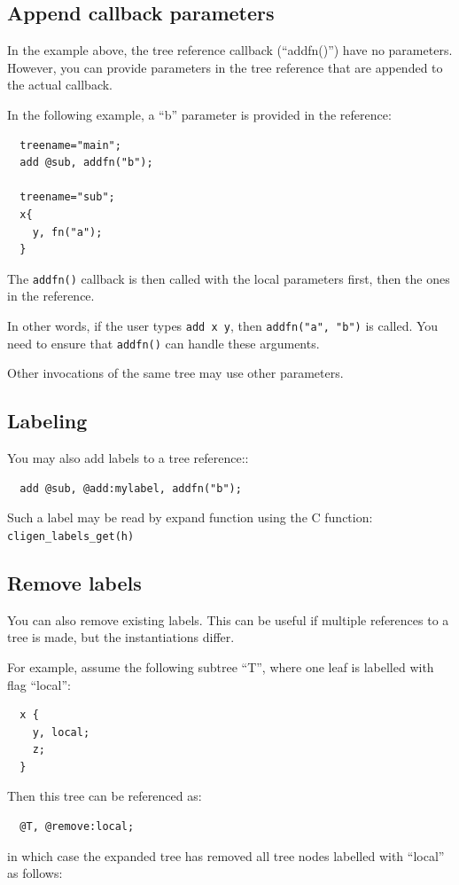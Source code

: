 \documentclass[a4paper, 10pt] {article}
\begin{document}
\subsection{Append callback parameters}

In the example above, the tree reference callback (``addfn()'') have no parameters. However, you can provide parameters in the tree reference that are appended to the actual callback.

In the following example, a ``b'' parameter is provided in the reference:
\begin{verbatim}
  treename="main";
  add @sub, addfn("b");

  treename="sub";
  x{
    y, fn("a");
  }
\end{verbatim}

The {\tt addfn()} callback is then called with the local parameters first, then the ones in the reference.

In other words, if the user types {\tt add x y}, then {\tt addfn("a", "b")} is called. You need to ensure that {\tt addfn()} can handle these arguments.

Other invocations of the same tree may use other parameters.

\subsection{Labeling}

You may also add labels to a tree reference::
\begin{verbatim}
  add @sub, @add:mylabel, addfn("b");
\end{verbatim}

Such a label may be read by expand function using the C function: {\tt cligen\_labels\_get(h)}

\subsection{Remove labels}

You can also remove existing labels. This can be useful if multiple references to a tree is made, but the instantiations differ.

For example, assume the following subtree ``T'', where one leaf is labelled with flag ``local'':
\begin{verbatim}
  x {
    y, local;
    z;
  }
\end{verbatim}

Then this tree can be referenced as:
\begin{verbatim}
  @T, @remove:local;
\end{verbatim}
in which case the expanded tree has removed all tree nodes labelled with ``local'' as follows:
\end{document}
